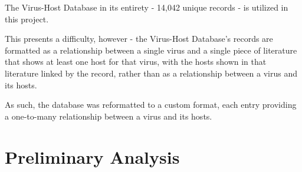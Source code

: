 \documentclass[12pt]{article}
\begin{document}
    The Virus-Host Database in its entirety - 14,042 unique records - is utilized in
    this project.

    This presents a difficulty, however - the Virus-Host Database's records are
    formatted as a relationship between a single virus and a single piece of
    literature that shows at least one host for that virus, with the hosts shown
    in that literature linked by the record, rather than as a relationship between a
    virus and its hosts.

    As such, the database was reformatted to a custom format, each entry providing
    a one-to-many relationship between a virus and its hosts.


    

    \section{Preliminary Analysis}
\end{document}

